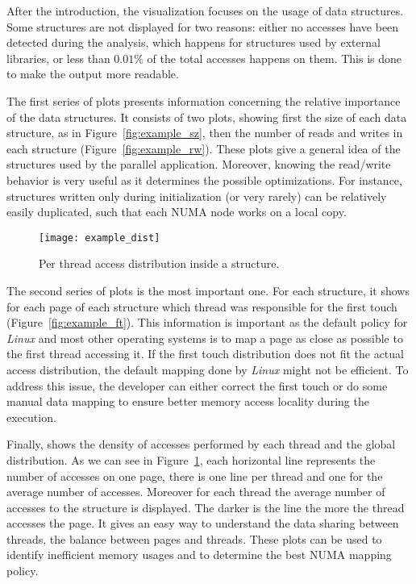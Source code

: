 After the introduction, the visualization focuses on the usage of data structures. Some
structures are not displayed for two reasons: either no accesses have been
detected during the analysis, which happens for structures used by external
libraries, or less than $0.01\%$ of the total accesses happens on them. This is
done to make the output more readable.

The first series of plots presents information concerning the relative
importance of the data structures. It consists of two plots, showing first the
size of each data structure, as in Figure~\ref{fig:example_sz}, then the
number of reads and writes  in each structure (Figure~\ref{fig:example_rw}). These plots give a
general idea of the structures used by the parallel application.
Moreover, knowing the read/write behavior is very
useful as it determines the possible optimizations. For instance, structures
written only during initialization (or very rarely) can be relatively easily
duplicated, such that each NUMA node works on a local copy.

\begin{figure}[!htb]
    \centering
    \texttt{[image: example\_dist]}
    \caption{Per thread access distribution inside a structure.}
    \label{fig:example_dist}
\end{figure}

The second series of plots is the most important one. For each structure, it
shows for each page of each structure
which thread was responsible for the first touch
(Figure~\ref{fig:example_ft}). This information is important as the
default policy for \emph{Linux} and most other operating systems is to map a page as close as possible to the first
thread accessing it. If the first touch distribution does not fit the actual
access distribution, the default mapping done by \emph{Linux} might not be
efficient. To address this issue, the developer can either correct the first
touch or do some manual data mapping to ensure better memory access locality
during the execution.

Finally, \TABARNAC shows the density of accesses performed by each thread and
the global distribution. As we can see in Figure~\ref{fig:example_dist}, each
horizontal line represents the number of accesses on one page, there is one
line per thread and one for the average number of accesses. Moreover for each
thread the average number of accesses to the structure is displayed. The
darker is the line the more the thread accesses the page. It gives an easy way
to understand the data sharing between threads, the balance between pages and
threads. These plots can be used to identify inefficient memory usages and to
determine the best NUMA mapping policy.

